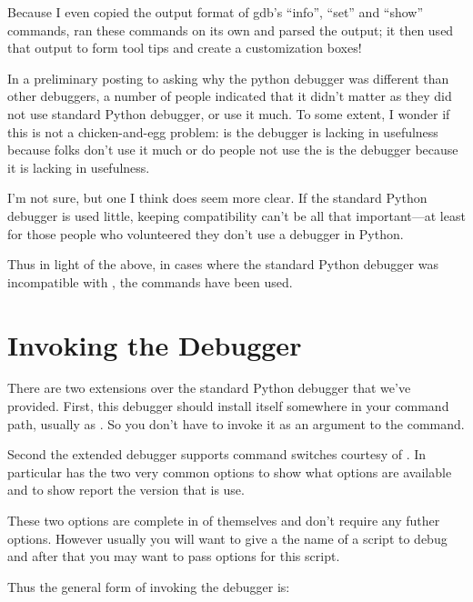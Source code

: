 Because I even copied the output format of gdb's ``info'', ``set'' and
``show'' commands,  ran these commands on its own and parsed
the output; it then used that output to form tool tips and create a
customization boxes!

In a preliminary posting to  asking why the
python debugger was different than other debuggers, a number of people
indicated that it didn't matter as they did not use standard Python
debugger, or use it much.  To some extent, I wonder if this is not a
chicken-and-egg problem: is the debugger is lacking in usefulness
because folks don't use it much or do people not use the is the
debugger because it is lacking in usefulness.

I'm not sure, but one I think does seem more clear. If the standard
Python debugger is used little, keeping compatibility can't be all
that important---at least for those people who volunteered they don't
use a debugger in Python.

Thus in light of the above, in cases where the standard Python
debugger was incompatible with , the  commands
have been used.

\section{Invoking the Debugger \label{debugger-switches}}

There are two extensions over the standard Python debugger that we've
provided. First, this debugger should install itself somewhere in your
command path, usually as . So you don't have to invoke it
as an argument to the  command.

Second the extended debugger supports command switches courtesy of
.
In particular  has the two very common options
 to show what options are available and 
to show report the version that is use. 

These two options are complete in of themselves and don't require any
futher options. However usually you will want to give a the name of a
script to debug and after that you may want to pass options for this
script.

Thus the general form of invoking the debugger is:

   

